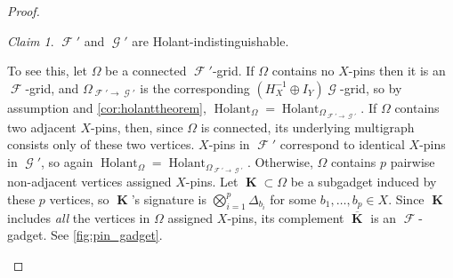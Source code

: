 \documentclass{article}
\theoremstyle{remark}
\newtheorem{claim}{Claim}[section]
\theoremstyle{definition}
\DeclareMathOperator{\vk}{\mathbf{K}}
\DeclareMathOperator{\fc}{\mathcal{F}}
\DeclareMathOperator{\gc}{\mathcal{G}}
\DeclareMathOperator{\holant}{Holant}
\begin{document}
\begin{proof}
\begin{equation}
    \end{equation}
    \begin{claim}
        $\fc'$ and $\gc'$ are Holant-indistinguishable.
        \label{claim:equiv}
    \end{claim}
    To see this, let $\Omega$ be a connected $\fc'$-grid. If $\Omega$ contains no 
    $X$-pins then it is an $\fc$-grid, and 
    $\Omega_{\fc'\to\gc'}$ is the corresponding $(H_X^{-1} \oplus I_Y)\gc$-grid, so by assumption and \autoref{cor:holanttheorem}, $\holant_\Omega = \holant_{\Omega_{\fc'\to\gc'}}$.
    If $\Omega$ contains two adjacent $X$-pins, then, since $\Omega$ is connected, its underlying 
    multigraph
    consists only of these two vertices. $X$-pins in $\fc'$ correspond to identical $X$-pins in $\gc'$, so
    again $\holant_\Omega = \holant_{\Omega_{\fc'\to\gc'}}$. Otherwise, $\Omega$ contains $p$ 
    pairwise non-adjacent vertices assigned $X$-pins.
    Let $\vk \subset \Omega$ be a subgadget induced by these $p$ vertices, so
    $\vk$'s signature is $\bigotimes_{i=1}^p \Delta_{b_i}$ for some $b_1,\ldots,b_p \in X$.
    Since $\vk$ includes \emph{all}
    the vertices in $\Omega$ assigned $X$-pins, its complement $\overline{\vk}$ is an $\fc$-gadget.
    See \autoref{fig:pin_gadget}. 
    \begin{figure}[ht!]
        \centering
\end{figure}
\end{proof}
\end{document}
